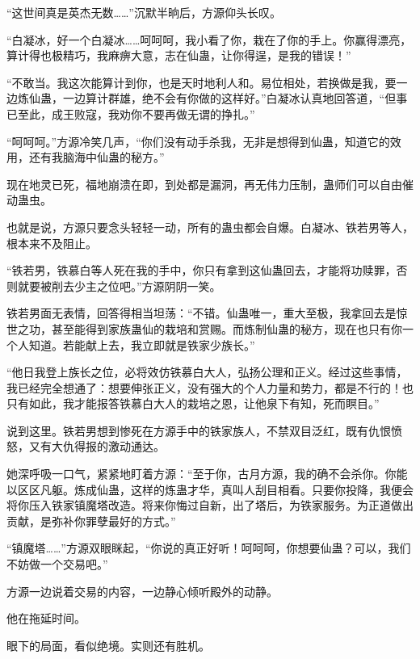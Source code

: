 
\begin{this_body}



“这世间真是英杰无数……”沉默半晌后，方源仰头长叹。

“白凝冰，好一个白凝冰……呵呵呵，我小看了你，栽在了你的手上。你赢得漂亮，算计得也极精巧，我麻痹大意，志在仙蛊，让你得逞，是我的错误！”

“不敢当。我这次能算计到你，也是天时地利人和。易位相处，若换做是我，要一边炼仙蛊，一边算计群雄，绝不会有你做的这样好。”白凝冰认真地回答道，“但事已至此，成王败寇，我劝你不要再做无谓的挣扎。”

“呵呵呵。”方源冷笑几声，“你们没有动手杀我，无非是想得到仙蛊，知道它的效用，还有我脑海中仙蛊的秘方。”

现在地灵已死，福地崩溃在即，到处都是漏洞，再无伟力压制，蛊师们可以自由催动蛊虫。

也就是说，方源只要念头轻轻一动，所有的蛊虫都会自爆。白凝冰、铁若男等人，根本来不及阻止。

“铁若男，铁慕白等人死在我的手中，你只有拿到这仙蛊回去，才能将功赎罪，否则就要被削去少主之位吧。”方源阴阴一笑。

铁若男面无表情，回答得相当坦荡：“不错。仙蛊唯一，重大至极，我拿回去是惊世之功，甚至能得到家族蛊仙的栽培和赏赐。而炼制仙蛊的秘方，现在也只有你一个人知道。若能献上去，我立即就是铁家少族长。”

“他日我登上族长之位，必将效仿铁慕白大人，弘扬公理和正义。经过这些事情，我已经完全想通了：想要伸张正义，没有强大的个人力量和势力，都是不行的！也只有如此，我才能报答铁慕白大人的栽培之恩，让他泉下有知，死而瞑目。”

说到这里。铁若男想到惨死在方源手中的铁家族人，不禁双目泛红，既有仇恨愤怒，又有大仇得报的激动通达。

她深呼吸一口气，紧紧地盯着方源：“至于你，古月方源，我的确不会杀你。你能以区区凡躯。炼成仙蛊，这样的炼蛊才华，真叫人刮目相看。只要你投降，我便会将你压入铁家镇魔塔改造。将来你悔过自新，出了塔后，为铁家服务。为正道做出贡献，是弥补你罪孽最好的方式。”

“镇魔塔……”方源双眼眯起，“你说的真正好听！呵呵呵，你想要仙蛊？可以，我们不妨做一个交易吧。”

方源一边说着交易的内容，一边静心倾听殿外的动静。

他在拖延时间。

眼下的局面，看似绝境。实则还有胜机。


\end{this_body}
